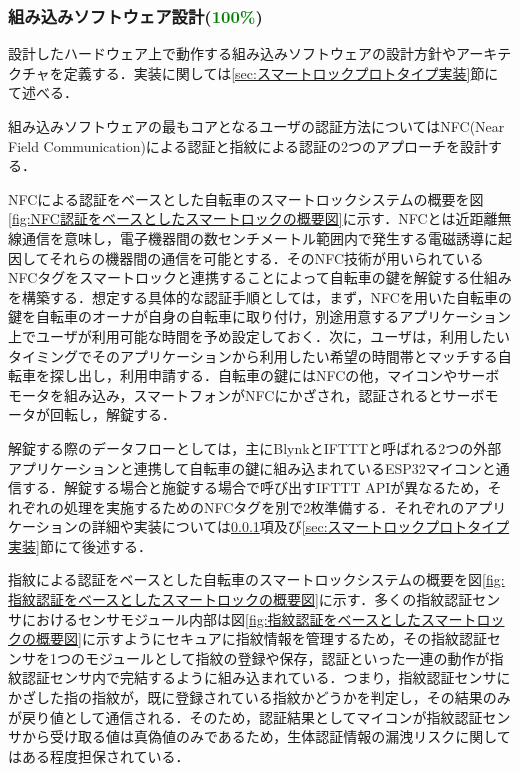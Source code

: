       \subsubsection{組み込みソフトウェア設計(\textcolor{green}{100\%})}
        \label{sec:組み込みソフトウェア設計}
          \par 設計したハードウェア上で動作する組み込みソフトウェアの設計方針やアーキテクチャを定義する．実装に関しては\ref{sec:スマートロックプロトタイプ実装}節にて述べる．
          \par 組み込みソフトウェアの最もコアとなるユーザの認証方法についてはNFC(Near Field Communication)による認証と指紋による認証の2つのアプローチを設計する．
          \par NFCによる認証をベースとした自転車のスマートロックシステムの概要を図\ref{fig:NFC認証をベースとしたスマートロックの概要図}に示す．NFCとは近距離無線通信を意味し，電子機器間の数センチメートル範囲内で発生する電磁誘導に起因してそれらの機器間の通信を可能とする．そのNFC技術が用いられているNFCタグをスマートロックと連携することによって自転車の鍵を解錠する仕組みを構築する．想定する具体的な認証手順としては，まず，NFCを用いた自転車の鍵を自転車のオーナが自身の自転車に取り付け，別途用意するアプリケーション上でユーザが利用可能な時間を予め設定しておく．次に，ユーザは，利用したいタイミングでそのアプリケーションから利用したい希望の時間帯とマッチする自転車を探し出し，利用申請する．自転車の鍵にはNFCの他，マイコンやサーボモータを組み込み，スマートフォンがNFCにかざされ，認証されるとサーボモータが回転し，解錠する．
          \par 解錠する際のデータフローとしては，主にBlynkとIFTTTと呼ばれる2つの外部アプリケーションと連携して自転車の鍵に組み込まれているESP32マイコンと通信する．解錠する場合と施錠する場合で呼び出すIFTTT APIが異なるため，それぞれの処理を実施するためのNFCタグを別で2枚準備する．それぞれのアプリケーションの詳細や実装については\ref{sec:組み込みソフトウェア設計}項及び\ref{sec:スマートロックプロトタイプ実装}節にて後述する．
          \par 指紋による認証をベースとした自転車のスマートロックシステムの概要を図\ref{fig:指紋認証をベースとしたスマートロックの概要図}に示す．多くの指紋認証センサにおけるセンサモジュール内部は図\ref{fig:指紋認証をベースとしたスマートロックの概要図}に示すようにセキュアに指紋情報を管理するため，その指紋認証センサを1つのモジュールとして指紋の登録や保存，認証といった一連の動作が指紋認証センサ内で完結するように組み込まれている．つまり，指紋認証センサにかざした指の指紋が，既に登録されている指紋かどうかを判定し，その結果のみが戻り値として通信される．そのため，認証結果としてマイコンが指紋認証センサから受け取る値は真偽値のみであるため，生体認証情報の漏洩リスクに関してはある程度担保されている．

